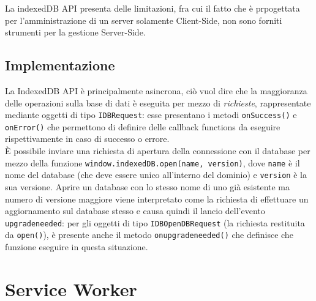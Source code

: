 \documentclass[a4paper, 12pt, twoside, openright]{book}
\begin{document}
La indexedDB API presenta delle limitazioni, fra cui il fatto che è prpogettata per l'amministrazione di un server solamente Client-Side, non sono forniti strumenti per la gestione Server-Side.\\
\subsection{Implementazione}
La IndexedDB API è principalmente asincrona, ciò vuol dire che la maggioranza delle operazioni sulla base di dati è eseguita per mezzo di \textit{richieste}, rappresentate mediante oggetti di tipo \texttt{IDBRequest}: esse presentano i metodi \texttt{onSuccess()} e \texttt{onError()} che permettono di definire delle callback functions da eseguire rispettivamente in caso di successo o errore.\\
È possibile inviare una richiesta di apertura della connessione con il database per mezzo della funzione \texttt{window.indexedDB.open(name, version)}, dove \texttt{name} è il nome del database (che deve essere unico all'interno del dominio) e \texttt{version} è la sua versione. Aprire un database con lo stesso nome di uno già esistente ma numero di versione maggiore viene interpretato come la richiesta di effettuare un aggiornamento sul database stesso e causa quindi il lancio dell'evento \texttt{upgradeneeded}: per gli oggetti di tipo \texttt{IDBOpenDBRequest} (la richiesta restituita da \texttt{open()}), è presente anche il metodo \texttt{onupgradeneeded()} che definisce che funzione eseguire in questa situazione.\\

\section{Service Worker}

\backmatter

\begingroup %
  \makeatletter
  \let\ps@plain\ps@empty
  \makeatother
  
\endgroup
\end{document}
